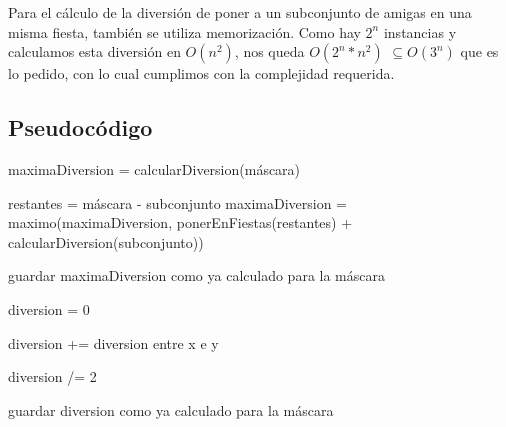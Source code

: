 Para el cálculo de la diversión de poner a un subconjunto de amigas en una misma fiesta, también se utiliza memorización. Como hay $2^{n}$ instancias y calculamos esta diversión en $O(n^{2})$, nos queda $O(2^{n}*n^{2})$ $\subseteq O(3^{n})$ que es lo pedido, con lo cual cumplimos con la complejidad requerida.

\subsection{Pseudocódigo}

\begin{algorithmic}



    	\State {}
  	\EndIf		

    	\State {}
  	\EndIf	

  \State maximaDiversion = calcularDiversion(máscara) 

  	\State restantes = máscara - subconjunto  
  	\State maximaDiversion = maximo(maximaDiversion, ponerEnFiestas(restantes) + calcularDiversion(subconjunto))
  \EndFor

  \State guardar maximaDiversion como ya calculado para la máscara

 \State {}

\EndFunction

\end{algorithmic}

\vspace{5mm}


\begin{algorithmic}



    	\State {}
  	\EndIf		

  	\State diversion = 0

  			\State diversion += diversion entre x e y
  		\EndFor
  	\EndFor

  	\State diversion /= 2 

  	\State guardar diversion como ya calculado para la máscara

 	\State {}

\EndFunction

\end{algorithmic}
